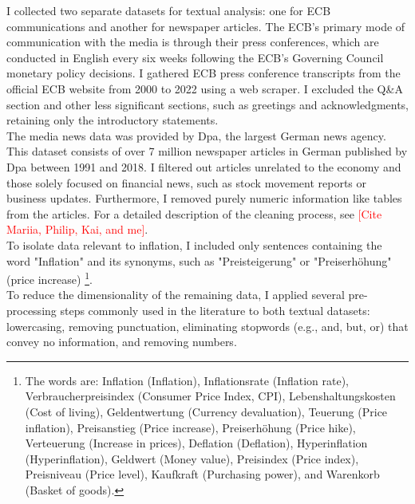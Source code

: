 \documentclass[review]{elsarticle}
\begin{document}
I collected two separate datasets for textual analysis: one for ECB communications and another for newspaper articles. The ECB's primary mode of communication with the media is through their press conferences, which are conducted in English every six weeks following the ECB's Governing Council monetary policy decisions. I gathered ECB press conference transcripts from the official ECB website from 2000 to 2022 using a web scraper. I excluded the Q\&A section and other less significant sections, such as greetings and acknowledgments, retaining only the introductory statements.
\\
The media news data was provided by Dpa, the largest German news agency. This dataset consists of over 7 million newspaper articles in German published by Dpa between 1991 and 2018. I filtered out articles unrelated to the economy and those solely focused on financial news, such as stock movement reports or business updates. Furthermore, I removed purely numeric information like tables from the articles. For a detailed description of the cleaning process, see \textcolor{red}{[Cite Mariia, Philip, Kai, and me]}.
\\
To isolate data relevant to inflation, I included only sentences containing the word "Inflation" and its synonyms, such as "Preisteigerung" or "Preiserhöhung" (price increase) \footnote{The words are: Inflation (Inflation), Inflationsrate (Inflation rate), Verbraucherpreisindex (Consumer Price Index, CPI), Lebenshaltungskosten (Cost of living), Geldentwertung (Currency devaluation), Teuerung (Price inflation), Preisanstieg (Price increase), Preiserhöhung (Price hike), Verteuerung (Increase in prices), Deflation (Deflation), Hyperinflation (Hyperinflation), Geldwert (Money value), Preisindex (Price index), Preisniveau (Price level), Kaufkraft (Purchasing power), and Warenkorb (Basket of goods).}.
\\
To reduce the dimensionality of the remaining data, I applied several pre-processing steps commonly used in the literature to both textual datasets: lowercasing, removing punctuation, eliminating stopwords (e.g., and, but, or) that convey no information, and removing numbers.
\end{document}
